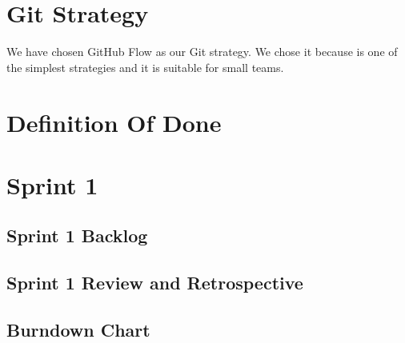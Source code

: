 \documentclass{article}
\begin{document}
\section{Git Strategy}

We have chosen GitHub Flow as our Git strategy.
We chose it because is one of the simplest strategies and it is suitable for small teams.

\section{Definition Of Done}

\section{Sprint 1}

\subsection{Sprint 1 Backlog}

\subsection{Sprint 1 Review and Retrospective}

\subsection{Burndown Chart}
\end{document}
